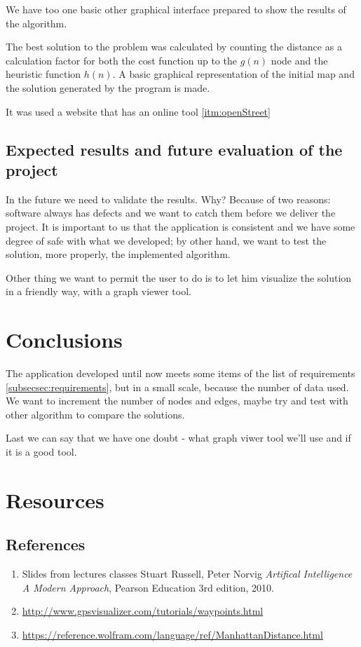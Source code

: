 \documentclass[a4paper]{article}
\begin{document}
We have too one basic other graphical interface prepared to show the results of the algorithm.


The best solution to the problem was calculated by counting the distance as a calculation factor for both the cost function up to the $g(n)$ node and the heuristic function $h(n)$. A basic graphical representation of the initial map and the solution generated by the program is made.

It was used a website that has an online tool \ref{itm:openStreet}

\subsection{Expected results and future evaluation of the project}

In the future we need to validate the results. Why? Because of two reasons: software always has defects and we want to catch them before we deliver the project. It is important to us that the application is consistent and we have some degree of safe with what we developed; by other hand, we want to test the solution, more properly, the implemented algorithm. 

Other thing we want to permit the user to do is to let him visualize the solution in a friendly way, with a graph viewer tool.

\section{Conclusions} 

The application developed until now meets some items of the list of requirements \ref{subsecsec:requirements}, but in a small scale, because the number of data used. We want to increment the number of nodes and edges, maybe try and test with other algorithm to compare the solutions. 

Last we can say that we have one doubt - what graph viwer tool we'll use and if it is a good tool. 

\newpage

\section{Resources}

\subsection{References}

\begin{enumerate}
	
	\item Slides from lectures classes
	Stuart Russell, Peter Norvig
	\emph{Artifical Intelligence A Modern Approach},
	Pearson Education
	3rd edition,
	2010.
	\item \url{http://www.gpsvisualizer.com/tutorials/waypoints.html} 
	\item \url{https://reference.wolfram.com/language/ref/ManhattanDistance.html}

\end{enumerate}
\end{document}
